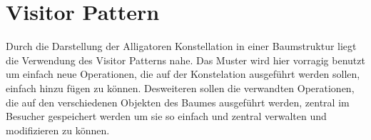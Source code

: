 \section{Visitor Pattern}
Durch die Darstellung der Alligatoren Konstellation in einer Baumstruktur liegt die Verwendung des Visitor
 Patterns nahe. Das Muster wird hier vorragig benutzt um einfach neue Operationen, die auf der Konstelation ausgeführt werden sollen, einfach hinzu fügen zu können. Desweiteren sollen die verwandten Operationen, 
die auf den verschiedenen Objekten des Baumes ausgeführt werden, zentral im Besucher gespeichert werden um
sie so einfach und zentral verwalten und modifizieren zu können. 

